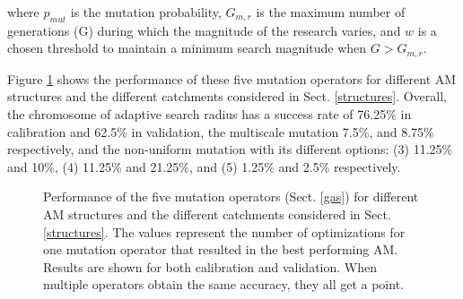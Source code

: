 \documentclass[draft]{agujournal2019}
\begin{document}
where $p_{mut}$ is the mutation probability, $G_{m,r}$ is the maximum number of generations (G) during which the magnitude of the research varies, and $w$ is a chosen threshold to maintain a minimum search magnitude when $G>G_{m,r}$.

Figure \ref{fig_mutation_operators_perfs} shows the performance of these five mutation operators for different AM structures and the different catchments considered in Sect. \ref{structures}. Overall, the chromosome of adaptive search radius has a success rate of 76.25\% in calibration and 62.5\% in validation, the multiscale mutation 7.5\%, and 8.75\% respectively, and the non-uniform mutation with its different options: (3) 11.25\% and 10\%, (4) 11.25\% and 21.25\%, and (5) 1.25\% and 2.5\% respectively.

\begin{figure}[hbt]
	\noindent{}
	\caption{Performance of the five mutation operators (Sect. \ref{gas}) for different AM structures and the different catchments considered in Sect. \ref{structures}. The values represent the number of optimizations for one mutation operator that resulted in the best performing AM. Results are shown for both calibration and validation. When multiple operators obtain the same accuracy, they all get a point.}
	\label{fig_mutation_operators_perfs}
\end{figure}
\end{document}
